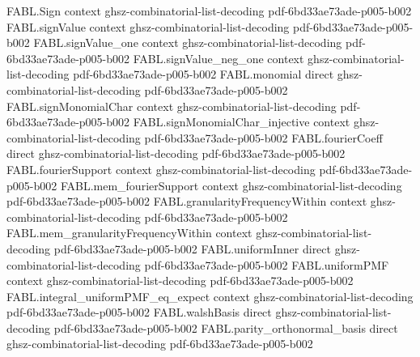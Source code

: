 \begin{theorem}
\label{FABL.FiniteFourierBasis.fourierCoeff_injective}
\leanok
{}
\proofstep
  {FABL.Sign}
  {context}
  {ghsz-combinatorial-list-decoding}
  {pdf-6bd33ae73ade-p005-b002}
\proofstep
  {FABL.signValue}
  {context}
  {ghsz-combinatorial-list-decoding}
  {pdf-6bd33ae73ade-p005-b002}
\proofstep
  {FABL.signValue_one}
  {context}
  {ghsz-combinatorial-list-decoding}
  {pdf-6bd33ae73ade-p005-b002}
\proofstep
  {FABL.signValue_neg_one}
  {context}
  {ghsz-combinatorial-list-decoding}
  {pdf-6bd33ae73ade-p005-b002}
\proofstep
  {FABL.monomial}
  {direct}
  {ghsz-combinatorial-list-decoding}
  {pdf-6bd33ae73ade-p005-b002}
\proofstep
  {FABL.signMonomialChar}
  {context}
  {ghsz-combinatorial-list-decoding}
  {pdf-6bd33ae73ade-p005-b002}
\proofstep
  {FABL.signMonomialChar_injective}
  {context}
  {ghsz-combinatorial-list-decoding}
  {pdf-6bd33ae73ade-p005-b002}
\proofstep
  {FABL.fourierCoeff}
  {direct}
  {ghsz-combinatorial-list-decoding}
  {pdf-6bd33ae73ade-p005-b002}
\proofstep
  {FABL.fourierSupport}
  {context}
  {ghsz-combinatorial-list-decoding}
  {pdf-6bd33ae73ade-p005-b002}
\proofstep
  {FABL.mem_fourierSupport}
  {context}
  {ghsz-combinatorial-list-decoding}
  {pdf-6bd33ae73ade-p005-b002}
\proofstep
  {FABL.granularityFrequencyWithin}
  {context}
  {ghsz-combinatorial-list-decoding}
  {pdf-6bd33ae73ade-p005-b002}
\proofstep
  {FABL.mem_granularityFrequencyWithin}
  {context}
  {ghsz-combinatorial-list-decoding}
  {pdf-6bd33ae73ade-p005-b002}
\proofstep
  {FABL.uniformInner}
  {direct}
  {ghsz-combinatorial-list-decoding}
  {pdf-6bd33ae73ade-p005-b002}
\proofstep
  {FABL.uniformPMF}
  {context}
  {ghsz-combinatorial-list-decoding}
  {pdf-6bd33ae73ade-p005-b002}
\proofstep
  {FABL.integral_uniformPMF_eq_expect}
  {context}
  {ghsz-combinatorial-list-decoding}
  {pdf-6bd33ae73ade-p005-b002}
\proofstep
  {FABL.walshBasis}
  {direct}
  {ghsz-combinatorial-list-decoding}
  {pdf-6bd33ae73ade-p005-b002}
\proofstep
  {FABL.parity_orthonormal_basis}
  {direct}
  {ghsz-combinatorial-list-decoding}
  {pdf-6bd33ae73ade-p005-b002}

\end{theorem}
